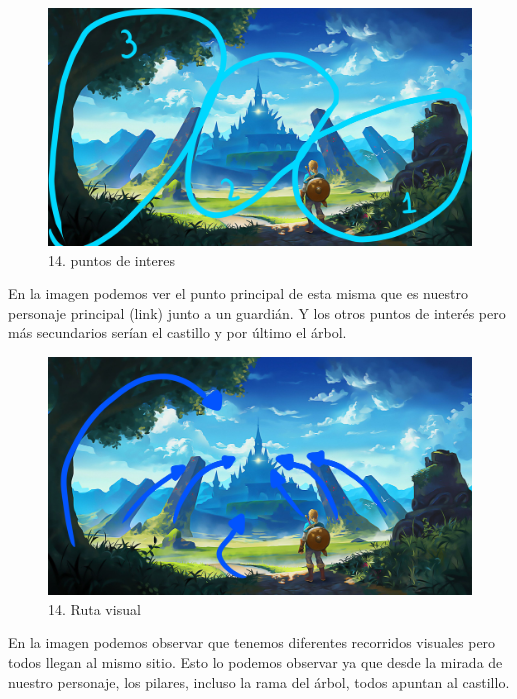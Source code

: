 \documentclass[12pt]{article}
\begin{document}
    \begin{figure}[H]
      \centering
      \includegraphics[width=\textwidth]{images/Selena/14 puntos de interesex.jpg}
      \caption{\small 14. puntos de interes}
    \end{figure}
    En la imagen podemos ver el punto principal de esta misma que es nuestro personaje principal (link) junto a un guardián. Y los otros puntos de interés pero más secundarios serían el castillo y por último el árbol. 

    \begin{figure}[H]
      \centering
      \includegraphics[width=\textwidth]{images/Selena/14 flechas.jpg}
      \caption{\small 14. Ruta visual}
    \end{figure}
    En la imagen podemos observar que tenemos diferentes recorridos visuales pero todos llegan al mismo sitio. Esto lo podemos observar ya que desde la mirada de nuestro personaje, los pilares, incluso la rama del árbol, todos apuntan al castillo. 
\end{document}
